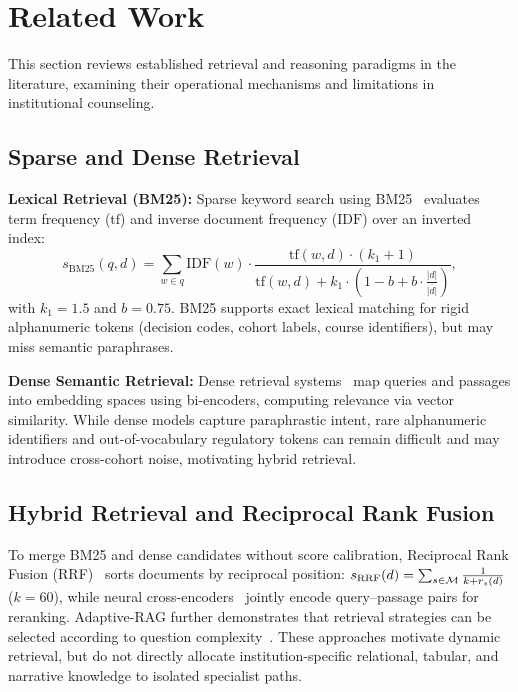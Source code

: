 \section{Related Work}
\label{sec:related}

This section reviews established retrieval and reasoning paradigms in the literature, examining their operational mechanisms and limitations in institutional counseling.

\subsection{Sparse and Dense Retrieval}
\label{sec:sparse_dense}

\textbf{Lexical Retrieval (BM25):} Sparse keyword search using BM25~\cite{robertson2009bm25} evaluates term frequency ($\mathrm{tf}$) and inverse document frequency ($\mathrm{IDF}$) over an inverted index:
\begin{equation}
  s_{\mathrm{BM25}}(q, d) = \sum_{w \in q} \mathrm{IDF}(w) \cdot \frac{\mathrm{tf}(w, d) \cdot (k_1 + 1)}{\mathrm{tf}(w, d) + k_1 \cdot \left(1 - b + b \cdot \frac{|d|}{\overline{|d|}}\right)},
\end{equation}
with $k_1 = 1.5$ and $b = 0.75$. BM25 supports exact lexical matching for rigid alphanumeric tokens (decision codes, cohort labels, course identifiers), but may miss semantic paraphrases.

\textbf{Dense Semantic Retrieval:} Dense retrieval systems~\cite{karpukhin2020dpr,lewis2020rag} map queries and passages into embedding spaces using bi-encoders, computing relevance via vector similarity. While dense models capture paraphrastic intent, rare alphanumeric identifiers and out-of-vocabulary regulatory tokens can remain difficult and may introduce cross-cohort noise, motivating hybrid retrieval.

\subsection{Hybrid Retrieval and Reciprocal Rank Fusion}
\label{sec:hybrid_rrf}

To merge BM25 and dense candidates without score calibration, Reciprocal Rank Fusion (RRF)~\cite{cormack2009rrf} sorts documents by reciprocal position: $s_{\mathrm{RRF}}(d) = \sum_{s \in \mathcal{M}} \frac{1}{k + r_s(d)}$ ($k = 60$), while neural cross-encoders~\cite{nogueira2019bert,xiao2023bge} jointly encode query--passage pairs for reranking. Adaptive-RAG further demonstrates that retrieval strategies can be selected according to question complexity~\cite{jeong2024adaptiverag}. These approaches motivate dynamic retrieval, but do not directly allocate institution-specific relational, tabular, and narrative knowledge to isolated specialist paths.

